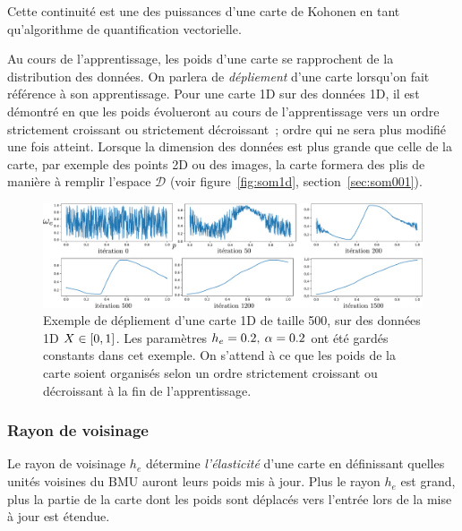 \documentclass[../main]{subfiles}
\begin{document}
Cette continuité est une des puissances d'une carte de Kohonen en tant qu'algorithme de quantification vectorielle. 

Au cours de l'apprentissage, les poids d'une carte se rapprochent de la distribution des données. On parlera de \emph{dépliement} d'une carte lorsqu'on fait référence à son apprentissage.
Pour une carte 1D sur des données 1D, il est démontré en \cite{Cottrell1998TheoreticalAO} que les poids évolueront au cours de l'apprentissage vers un ordre strictement croissant ou strictement décroissant~; ordre qui ne sera plus modifié une fois atteint. 
Lorsque la dimension des données est plus grande que celle de la carte, par exemple des points 2D ou des images, la carte formera des plis de manière à remplir l'espace $\mathcal{D}$ (voir figure~\ref{fig:som1d}, section~\ref{sec:som001}). 

\begin{figure}
\centering
\includegraphics[width=\textwidth]{depliement_1D.pdf}
\caption{Exemple de dépliement d'une carte 1D de taille 500, sur des données 1D $X \in [0,1]$. Les paramètres $h_{e} = 0.2, \: \alpha = 0.2$ ont été gardés constants dans cet exemple. On s'attend à ce que les poids de la carte soient organisés selon un ordre strictement croissant ou décroissant à la fin de l'apprentissage.}
\label{fig:depliement}
\end{figure}

\subsubsection{Rayon de voisinage}

Le rayon de voisinage $h_e$ détermine \emph{l'élasticité} d'une carte en définissant quelles unités voisines du BMU auront leurs poids mis à jour.
Plus le rayon $h_e$ est grand, plus la partie de la carte dont les poids sont déplacés vers l'entrée lors de la mise à jour est étendue. 
\end{document}

